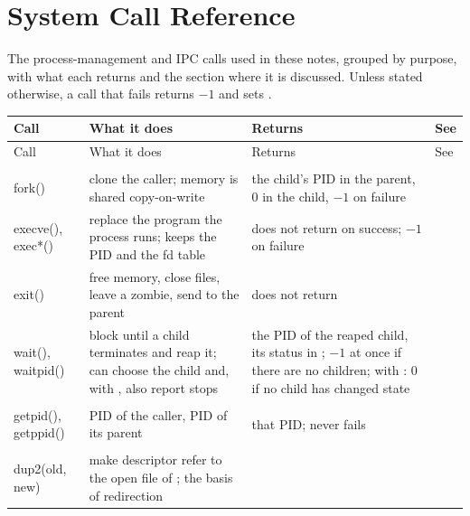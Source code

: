 \chapter{System Call Reference}
\label{app:syscalls}

The process-management and IPC calls used in these notes, grouped by purpose, with what each returns and the section where it is discussed. Unless stated otherwise, a call that fails returns $-1$ and sets .

{\small
\begin{xltabular}{\linewidth}{@{}>{\ttfamily}l >{\raggedright\arraybackslash}X >{\raggedright\arraybackslash}X l@{}}
  \toprule
  \normalfont Call & What it does & Returns & See \\
  \midrule
  \endfirsthead
  \toprule
  \normalfont Call & What it does & Returns & See \\
  \midrule
  \endhead
  \bottomrule
  \endlastfoot
   \\
  \addlinespace[2pt]
  fork() & clone the caller; memory is shared copy-on-write & the child's PID in the parent, $0$ in the child, $-1$ on failure &  \\
  execve(), exec*() & replace the program the process runs; keeps the PID and the fd table & does not return on success; $-1$ on failure &  \\
  exit() & free memory, close files, leave a zombie, send  to the parent & does not return &  \\
  wait(), waitpid() & block until a child terminates and reap it;  can choose the child and, with , also report stops & the PID of the reaped child, its status in ; $-1$ at once if there are no children;  with : $0$ if no child has changed state &  \\
  \midrule
   \\
  \addlinespace[2pt]
  getpid(), getppid() & PID of the caller, PID of its parent & that PID; never fails &  \\
  \midrule
   \\
  \addlinespace[2pt]
  dup2(old, new) & make descriptor  refer to the open file of ; the basis of redirection &  &  \\

\end{xltabular}}
